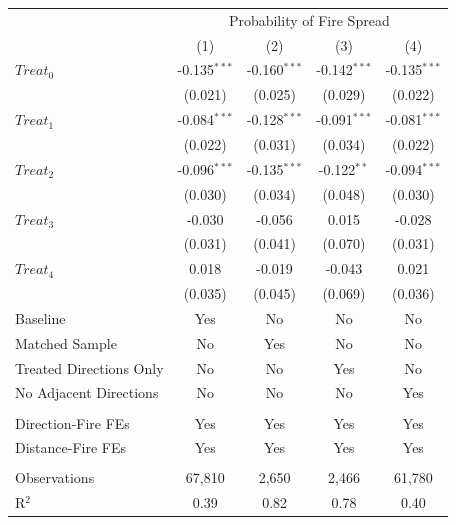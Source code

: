 \begingroup
\centering
\begin{tabular}{lcccc}
   \toprule
    & \multicolumn{4}{c}{Probability of Fire Spread}\\
                           & (1)            & (2)            & (3)            & (4)\\  
   \midrule 
   $Treat_0$               & -0.135$^{***}$ & -0.160$^{***}$ & -0.142$^{***}$ & -0.135$^{***}$\\   
                           & (0.021)        & (0.025)        & (0.029)        & (0.022)\\   
   $Treat_1$               & -0.084$^{***}$ & -0.128$^{***}$ & -0.091$^{***}$ & -0.081$^{***}$\\   
                           & (0.022)        & (0.031)        & (0.034)        & (0.022)\\   
   $Treat_2$               & -0.096$^{***}$ & -0.135$^{***}$ & -0.122$^{**}$  & -0.094$^{***}$\\   
                           & (0.030)        & (0.034)        & (0.048)        & (0.030)\\   
   $Treat_3$               & -0.030         & -0.056         & 0.015          & -0.028\\   
                           & (0.031)        & (0.041)        & (0.070)        & (0.031)\\   
   $Treat_4$               & 0.018          & -0.019         & -0.043         & 0.021\\   
                           & (0.035)        & (0.045)        & (0.069)        & (0.036)\\   
   Baseline                & Yes            & No             & No             & No\\  
   Matched Sample          & No             & Yes            & No             & No\\  
   Treated Directions Only & No             & No             & Yes            & No\\  
   No Adjacent Directions  & No             & No             & No             & Yes\\  
    \\
   Direction-Fire FEs      & Yes            & Yes            & Yes            & Yes\\  
   Distance-Fire FEs       & Yes            & Yes            & Yes            & Yes\\  
    \\
   Observations            & 67,810         & 2,650          & 2,466          & 61,780\\  
   R$^2$                   & 0.39           & 0.82           & 0.78           & 0.40\\  
   \bottomrule
\end{tabular}
\par\endgroup
